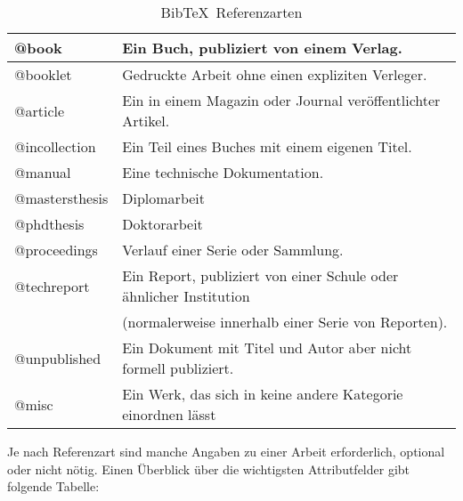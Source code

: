 \begin{table}[H]
	\centering
		\begin{tabular}[t]{|l|l|}
		\hline
		@book	& Ein Buch, publiziert von einem Verlag.\\
		\hline
		@booklet & Gedruckte Arbeit ohne einen expliziten Verleger.\\
		\hline
		@article & Ein in einem Magazin oder Journal veröffentlichter Artikel.\\
		\hline
		@incollection & Ein Teil eines Buches mit einem eigenen Titel.\\
		\hline
		@manual & Eine technische Dokumentation.\\
		\hline
		@mastersthesis & Diplomarbeit\\
		\hline
		@phdthesis & Doktorarbeit\\
		\hline
	  @proceedings & Verlauf einer Serie oder Sammlung.\\
	  \hline
    @techreport	& Ein Report, publiziert von einer Schule oder ähnlicher Institution\\ 
    & (normalerweise innerhalb einer Serie von Reporten).\\
    \hline
    @unpublished & Ein Dokument mit Titel und Autor aber nicht formell publiziert.\\
    \hline
		@misc & Ein Werk, das sich in keine andere Kategorie einordnen lässt\\
		\hline
		\end{tabular}
	\caption{Bib\TeX \ Referenzarten}
\end{table}

Je nach Referenzart sind manche Angaben zu einer Arbeit erforderlich, optional oder nicht nötig. Einen Überblick über die wichtigsten Attributfelder gibt folgende Tabelle:

